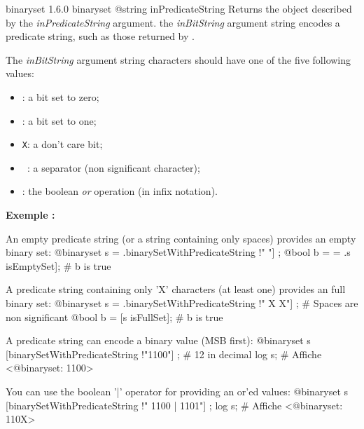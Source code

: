 {binaryset}
{1.6.0}
{binaryset}
{@string inPredicateString}
{Returns the  object described by the \emph{inPredicateString} argument.}
{the \emph{inBitString} argument string encodes a predicate string, such as those returned by .}
\begin{description}
\item The \emph{inBitString} argument string characters should have one of the five following values:
\begin{itemize}
\item \texttt{\textquotesingle}: a bit set to zero;
\item \texttt{\textquotesingle}: a bit set to one;
\item \texttt{\textquotesingle X\textquotesingle}: a don't care bit;
\item \texttt{\textquotesingle~\textquotesingle}: a separator (non significant character);
\item \texttt{\textquotesingle\textbar\textquotesingle}: the boolean \emph{or} operation (in infix notation).
\end{itemize}
\end{description}


\textbf{Exemple :}
\begin{galgascode}
An empty predicate string (or a string containing only spaces) provides an empty binary set:
@binaryset s = .binarySetWithPredicateString !" "] ;
@bool b = = .s isEmptySet]; # b is true
\end{galgascode}


\begin{galgascode}
A predicate string containing only 'X' characters (at least one) provides an full binary set:
@binaryset s = .binarySetWithPredicateString !" X X"] ; # Spaces are non significant
@bool b = [s isFullSet]; # b is true
\end{galgascode}


\begin{galgascode}
A predicate string can encode a binary value (MSB first):
@binaryset s [binarySetWithPredicateString !"1100"] ; # 12 in decimal
log s; # Affiche <@binaryset: 1100>
\end{galgascode}


\begin{galgascode}
You can use the boolean '|' operator for providing an or'ed values:
@binaryset s [binarySetWithPredicateString !" 1100 | 1101"] ;
log s; # Affiche <@binaryset: 110X>
\end{galgascode}



